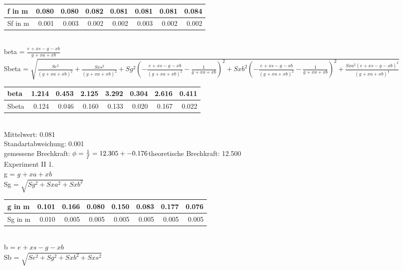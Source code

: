 	\begin{tabular}{| l | r|r|r|r|r|r|r|}
	\hline
        f in m& 0.080 & 0.080 & 0.082 & 0.081 & 0.081 & 0.081 & 0.084 \\ \hline Sf in m& 0.001 & 0.003 & 0.002 & 0.002 & 0.003 & 0.002 & 0.002 \\ \hline
	\end{tabular} \\ \bigskip \vspace{3 mm}  beta = $\frac{e_{} + xs - g_{} - xb}{g_{} + xa + xb}$\\Sbeta = $\sqrt{\frac{Se_{}^{2}}{\left(g_{} + xa + xb\right)^{2}} + \frac{Sxs^{2}}{\left(g_{} + xa + xb\right)^{2}} + Sg_{}^{2} \left(- \frac{e_{} + xs - g_{} - xb}{\left(g_{} + xa + xb\right)^{2}} - \frac{1}{g_{} + xa + xb}\right)^{2} + Sxb^{2} \left(- \frac{e_{} + xs - g_{} - xb}{\left(g_{} + xa + xb\right)^{2}} - \frac{1}{g_{} + xa + xb}\right)^{2} + \frac{Sxa^{2} \left(e_{} + xs - g_{} - xb\right)^{2}}{\left(g_{} + xa + xb\right)^{4}}}$\\\normalsize \vspace{3 mm}
	\begin{tabular}{| l | r|r|r|r|r|r|r|}
	\hline
        beta& 1.214 & 0.453 & 2.125 & 3.292 & 0.304 & 2.616 & 0.411 \\ \hline Sbeta& 0.124 & 0.046 & 0.160 & 0.133 & 0.020 & 0.167 & 0.022 \\ \hline
	\end{tabular} \\ \bigskip Mittelwert: 0.081\\Standartabweichung: 0.001\\gemessene Brechkraft: $\phi=\frac{1}{f}=12.305 +- 0.176\\ $theoretische Brechkraft: 12.500\\ Experiment II 1. \\ \vspace{3 mm}  g = $g_{} + xa + xb$\\Sg = $\sqrt{Sg_{}^{2} + Sxa^{2} + Sxb^{2}}$\\\normalsize \vspace{3 mm}
	\begin{tabular}{| l | r|r|r|r|r|r|r|}
	\hline
        g in m& 0.101 & 0.166 & 0.080 & 0.150 & 0.083 & 0.177 & 0.076 \\ \hline Sg in m& 0.010 & 0.005 & 0.005 & 0.005 & 0.005 & 0.005 & 0.005 \\ \hline
	\end{tabular} \\ \bigskip \vspace{3 mm}  b = $e_{} + xs - g_{} - xb$\\Sb = $\sqrt{Se_{}^{2} + Sg_{}^{2} + Sxb^{2} + Sxs^{2}}$\\\normalsize \vspace{3 mm}
